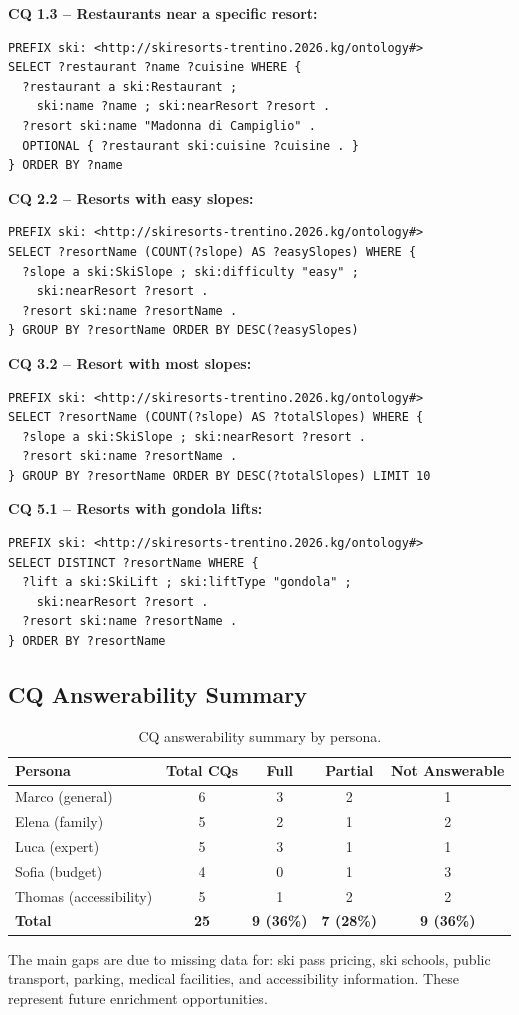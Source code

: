 \noindent\textbf{CQ 1.3 -- Restaurants near a specific resort:}
\begin{verbatim}
PREFIX ski: <http://skiresorts-trentino.2026.kg/ontology#>
SELECT ?restaurant ?name ?cuisine WHERE {
  ?restaurant a ski:Restaurant ;
    ski:name ?name ; ski:nearResort ?resort .
  ?resort ski:name "Madonna di Campiglio" .
  OPTIONAL { ?restaurant ski:cuisine ?cuisine . }
} ORDER BY ?name
\end{verbatim}

\noindent\textbf{CQ 2.2 -- Resorts with easy slopes:}
\begin{verbatim}
PREFIX ski: <http://skiresorts-trentino.2026.kg/ontology#>
SELECT ?resortName (COUNT(?slope) AS ?easySlopes) WHERE {
  ?slope a ski:SkiSlope ; ski:difficulty "easy" ;
    ski:nearResort ?resort .
  ?resort ski:name ?resortName .
} GROUP BY ?resortName ORDER BY DESC(?easySlopes)
\end{verbatim}

\noindent\textbf{CQ 3.2 -- Resort with most slopes:}
\begin{verbatim}
PREFIX ski: <http://skiresorts-trentino.2026.kg/ontology#>
SELECT ?resortName (COUNT(?slope) AS ?totalSlopes) WHERE {
  ?slope a ski:SkiSlope ; ski:nearResort ?resort .
  ?resort ski:name ?resortName .
} GROUP BY ?resortName ORDER BY DESC(?totalSlopes) LIMIT 10
\end{verbatim}

\noindent\textbf{CQ 5.1 -- Resorts with gondola lifts:}
\begin{verbatim}
PREFIX ski: <http://skiresorts-trentino.2026.kg/ontology#>
SELECT DISTINCT ?resortName WHERE {
  ?lift a ski:SkiLift ; ski:liftType "gondola" ;
    ski:nearResort ?resort .
  ?resort ski:name ?resortName .
} ORDER BY ?resortName
\end{verbatim}

\subsection{CQ Answerability Summary}

\begin{table}[h!]
\centering
\begin{tabular}{|l|c|c|c|c|}
\hline
\textbf{Persona} & \textbf{Total CQs} & \textbf{Full} & \textbf{Partial} & \textbf{Not Answerable} \\
\hline
Marco (general) & 6 & 3 & 2 & 1 \\
Elena (family) & 5 & 2 & 1 & 2 \\
Luca (expert) & 5 & 3 & 1 & 1 \\
Sofia (budget) & 4 & 0 & 1 & 3 \\
Thomas (accessibility) & 5 & 1 & 2 & 2 \\
\hline
\textbf{Total} & \textbf{25} & \textbf{9 (36\%)} & \textbf{7 (28\%)} & \textbf{9 (36\%)} \\
\hline
\end{tabular}
\caption{CQ answerability summary by persona.}
\end{table}

\noindent The main gaps are due to missing data for: ski pass pricing, ski schools, public transport, parking, medical facilities, and accessibility information. These represent future enrichment opportunities.
